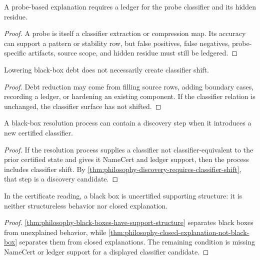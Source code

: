 \begin{theorem}
\label{thm:philosophy-probe-explanations-require-probe-ledger}
A probe-based explanation requires a ledger for the probe classifier and
its hidden residue.
\end{theorem}
\begin{proof}
A probe is itself a classifier extraction or compression map. Its
accuracy can support a pattern or stability row, but false positives,
false negatives, probe-specific artifacts, source scope, and hidden
residue must still be ledgered.
\end{proof}

\begin{theorem}
\label{thm:philosophy-black-box-reduction-not-necessarily-discovery}
Lowering black-box debt does not necessarily create classifier shift.
\end{theorem}
\begin{proof}
Debt reduction may come from filling source rows, adding boundary cases,
recording a ledger, or hardening an existing component. If the classifier
relation is unchanged, the classifier surface has not shifted.
\end{proof}

\begin{theorem}
\label{thm:philosophy-black-box-resolution-may-contain-discovery}
A black-box resolution process can contain a discovery step when it
introduces a new certified classifier.
\end{theorem}
\begin{proof}
If the resolution process supplies a classifier not classifier-equivalent
to the prior certified state and gives it NameCert and ledger support,
then the process includes classifier shift. By
\autoref{thm:philosophy-discovery-requires-classifier-shift}, that step
is a discovery candidate.
\end{proof}

\begin{theorem}
\label{thm:philosophy-black-box-missing-certificate-theorem}
In the certificate reading, a black box is uncertified supporting
structure: it is neither structureless behavior nor closed explanation.
\end{theorem}
\begin{proof}
\autoref{thm:philosophy-black-boxes-have-support-structure} separates
black boxes from unexplained behavior, while
\autoref{thm:philosophy-closed-explanation-not-black-box} separates them
from closed explanations. The remaining condition is missing NameCert or
ledger support for a displayed classifier candidate.
\end{proof}

